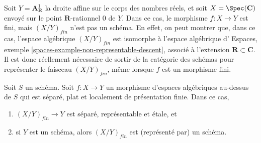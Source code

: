 \begin{remark}
\label{remark-not-scheme}
Soit $Y = \mathbf{A}^1_{\mathbf{R}}$ la droite affine sur le corps des nombres
réels, et soit $X = \Spec(\mathbf{C})$ envoyé sur le point
$\mathbf{R}$-rationnel $0$ de $Y$. Dans ce cas, le morphisme
$f : X \to Y$ est fini, mais $(X/Y)_{fin}$ n'est pas
un schéma. En effet, on peut montrer que, dans ce cas, l'espace
algébrique $(X/Y)_{fin}$ est isomorphe à l'espace algébrique d'
Espaces, exemple \ref{spaces-example-non-representable-descent},
associé à l'extension $\mathbf{R} \subset \mathbf{C}$.
Il est donc réellement nécessaire de sortir de la catégorie des schémas
pour représenter le faisceau $(X/Y)_{fin}$, même lorsque $f$
est un morphisme fini.
\end{remark}

\begin{lemma}
\label{lemma-finite-separated-flat-locally-finite-presentation}
Soit $S$ un schéma.
Soit $f : X \to Y$ un morphisme d'espaces algébriques au-dessus de $S$ qui
est séparé, plat et localement de présentation finie.
Dans ce cas,
\begin{enumerate}
\item $(X/Y)_{fin} \to Y$ est séparé, représentable et étale, et
\item si $Y$ est un schéma, alors $(X/Y)_{fin}$ est (représenté par) un schéma.
\end{enumerate}
\end{lemma}

